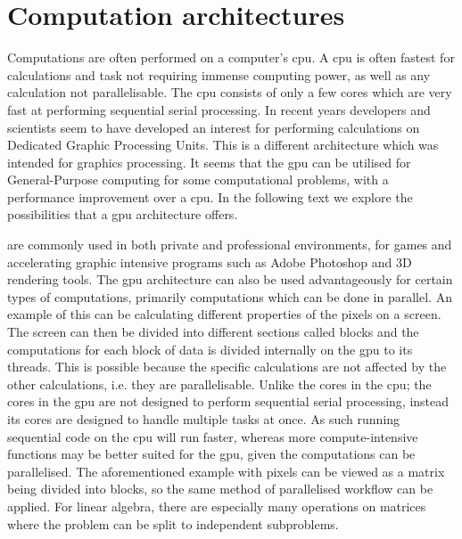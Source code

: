 \section{Computation architectures}
\label{sec:comparch}
Computations are often performed on a computer's  \acrshort{cpu}.
A \acrshort{cpu} is often fastest for calculations and task not requiring immense computing power, as well as any calculation not parallelisable.
The \acrshort{cpu} consists of only a few cores which are very fast at performing sequential serial processing. \citep{whatisgpu} 
In recent years developers and scientists seem to have developed an interest for performing calculations on Dedicated Graphic Processing Units. \citep{gpurise} 
This is a different architecture which was intended for graphics processing.
It seems that the \acrshort{gpu} can be utilised for General-Purpose computing for some computational problems, with a performance improvement over a \acrshort{cpu}.
In the following text we explore the possibilities that a \acrshort{gpu} architecture offers.

 are commonly used in both private and professional environments, for games and accelerating graphic intensive programs such as Adobe Photoshop and 3D rendering tools. \citep{NVIDIAADOBE,STEAMHW}
The \acrshort{gpu} architecture can also be used advantageously for certain types of computations, primarily computations which can be done in parallel. 
An example of this can be calculating different properties of the pixels on a screen. 
The screen can then be divided into different sections called blocks and the computations for each block of data is divided internally on the \acrshort{gpu} to its threads. 
This is possible because the specific calculations are not affected by the other calculations, i.e. they are parallelisable.
Unlike the cores in the \acrshort{cpu}; the cores in the \acrshort{gpu} are not designed to perform sequential serial processing, instead its cores are designed to handle multiple tasks at once. 
As such running sequential code on the \acrshort{cpu} will run faster, whereas more compute-intensive functions may be better suited for the \acrshort{gpu}, given the computations can be parallelised. \citep{NvidiaGPGPU}
The aforementioned example with pixels can be viewed as a matrix being divided into blocks, so the same method of parallelised workflow can be applied. 
For linear algebra, there are especially many operations on matrices where the problem can be split to independent subproblems.

